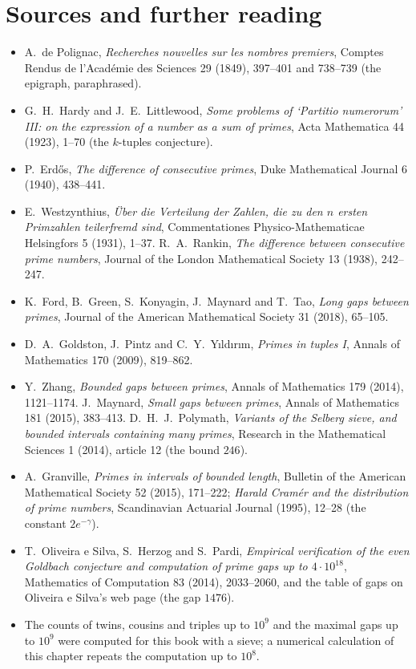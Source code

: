 \section*{Sources and further reading}

\begin{itemize}
\item A.~de Polignac, \emph{Recherches nouvelles sur les nombres premiers}, Comptes Rendus de l'Acad\'emie des Sciences 29 (1849), 397--401 and
738--739 (the epigraph, paraphrased).
\item G.~H.~Hardy and J.~E.~Littlewood, \emph{Some problems of `Partitio numerorum' III: on the expression of a number as a sum of primes}, Acta
Mathematica 44 (1923), 1--70 (the $k$-tuples conjecture).
\item P.~Erd\H{o}s, \emph{The difference of consecutive primes}, Duke Mathematical Journal 6 (1940), 438--441.
\item E.~Westzynthius, \emph{\"Uber die Verteilung der Zahlen, die zu den $n$ ersten Primzahlen teilerfremd sind}, Commentationes Physico-Mathematicae
Helsingfors 5 (1931), 1--37. R.~A.~Rankin, \emph{The difference between consecutive prime numbers}, Journal of the London Mathematical Society 13 (1938),
242--247.
\item K.~Ford, B.~Green, S.~Konyagin, J.~Maynard and T.~Tao, \emph{Long gaps between primes}, Journal of the American Mathematical Society 31 (2018),
65--105.
\item D.~A.~Goldston, J.~Pintz and C.~Y.~Y\i ld\i r\i m, \emph{Primes in tuples I}, Annals of Mathematics 170 (2009), 819--862.
\item Y.~Zhang, \emph{Bounded gaps between primes}, Annals of Mathematics 179 (2014), 1121--1174. J.~Maynard, \emph{Small gaps between primes}, Annals of
Mathematics 181 (2015), 383--413. D.~H.~J.~Polymath, \emph{Variants of the Selberg sieve, and bounded intervals containing many primes}, Research in the
Mathematical Sciences 1 (2014), article 12 (the bound $246$).
\item A.~Granville, \emph{Primes in intervals of bounded length}, Bulletin of the American Mathematical Society 52 (2015), 171--222; \emph{Harald Cram\'er
and the distribution of prime numbers}, Scandinavian Actuarial Journal (1995), 12--28 (the constant $2e^{-\gamma}$).
\item T.~Oliveira e Silva, S.~Herzog and S.~Pardi, \emph{Empirical verification of the even Goldbach conjecture and computation of prime gaps up to
$4\cdot10^{18}$}, Mathematics of Computation 83 (2014), 2033--2060, and the table of gaps on Oliveira e Silva's web page (the gap $1476$).
\item The counts of twins, cousins and triples up to $10^9$ and the maximal gaps up to $10^9$ were computed for this book with a sieve; a numerical calculation of
this chapter repeats the computation up to $10^8$.
\end{itemize}
